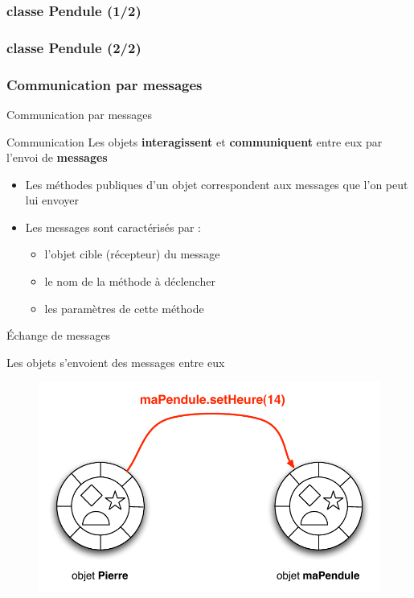 \begin{frame}[fragile]
\frametitle{classe Pendule (1/2)}

\end{frame}

\begin{frame}[fragile]
\frametitle{classe Pendule (2/2)}

\end{frame}

\subsubsection*{Communication par messages}

\begin{frame}{Communication par messages}
\begin{block}{Communication}
Les objets \textbf{interagissent} et \textbf{communiquent} entre eux par l'envoi de \textbf{messages}
\end{block}
\begin{itemize}
\pause	\item Les méthodes publiques d'un objet correspondent aux messages que l'on peut lui envoyer
\pause	\item Les messages sont caractérisés par :
	\begin{itemize}
		\pause \item l'objet cible (récepteur) du message
		\pause \item le nom de la méthode à déclencher
		\pause \item les paramètres de cette méthode
	\end{itemize}
\end{itemize}
\end{frame}

\begin{frame}{\'Echange de messages}
\begin{center}
	Les objets s'envoient des messages entre eux
\end{center}
  \begin{figure}[htbp]
    \begin{center}
      \includegraphics[scale=.55]{fig/messages.pdf}
    \end{center}
  \end{figure}
\end{frame}

